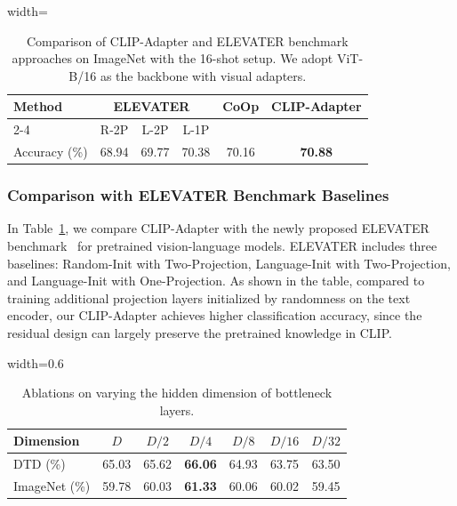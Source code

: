 \documentclass[default,iicol]{sn-jnl}%
\theoremstyle{thmstyleone}%
\theoremstyle{thmstyletwo}%
\theoremstyle{thmstylethree}%
\begin{document}
\begin{table}[t!]
\centering
\caption{Comparison of CLIP-Adapter and ELEVATER benchmark approaches on ImageNet with the 16-shot setup. We adopt ViT-B/16 as the backbone with visual adapters.}
\vspace*{6pt}
\begin{adjustbox}{width=\linewidth}
	\begin{tabular}{lccccc}
	\toprule
 \multirow{2.5}{*}{Method} &\multicolumn{3}{c}{ELEVATER~\cite{li2022elevater}} &\multirow{2.5}{*}{CoOp} &\multirow{2.5}{*}{CLIP-Adapter}\\\cmidrule{2-4}
		&R-2P &L-2P &L-1P &\\
  \midrule
		Accuracy (\%)  & 68.94		&69.77				&70.38 &70.16				&\textbf{70.88}\\
	\bottomrule
	\end{tabular}
\end{adjustbox}
\label{ELEVATER}
\end{table}

\subsubsection{Comparison with ELEVATER Benchmark Baselines}
\label{sec:ELEVATER}
In Table~\ref{ELEVATER}, we compare CLIP-Adapter with the newly proposed ELEVATER benchmark~\cite{li2022elevater} for pretrained vision-language models. ELEVATER includes three baselines: Random-Init with Two-Projection, Language-Init with Two-Projection, and Language-Init with One-Projection. As shown in the table, compared to training additional projection layers initialized by randomness on the text encoder, our CLIP-Adapter achieves higher classification accuracy, since the residual design can largely preserve the pretrained knowledge in CLIP.


\begin{table}[ht!]
\centering
\caption{Ablations on varying the hidden dimension of bottleneck layers.}
\vspace*{5pt}
\begin{adjustbox}{width=0.6\linewidth}
	\begin{tabular}{lcccccc}
	\toprule
		Dimension & $D$    &  $D/2$  &  $D/4$  &  $D/8$ & $D/16$ &  $D/32$ \\
		\midrule
		DTD (\%)  & 65.03 & 65.62 &  \textbf{66.06} & 64.93 & 63.75 & 63.50 \\
		ImageNet (\%)  & 59.78 &  60.03 & \textbf{61.33} & 60.06 & 60.02 & 59.45 \\
	\bottomrule
	\end{tabular}
\end{adjustbox}
\label{dimension}
\end{table}
\end{document}
